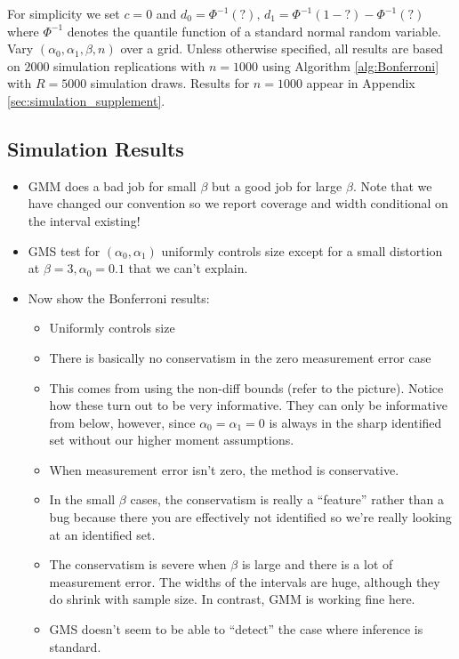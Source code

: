 For simplicity we set $c = 0$ and $d_0 = \Phi^{-1}(?), \, d_1= \Phi^{-1}(1 - ?) - \Phi^{-1}(?)$ where $\Phi^{-1}$ denotes the quantile function of a standard normal random variable.
Vary $(\alpha_0, \alpha_1, \beta, n)$ over a grid.
Unless otherwise specified, all results are based on $2000$ simulation replications with $n = 1000$ using Algorithm \ref{alg:Bonferroni} with $R = 5000$ simulation draws.
Results for $n = 1000$ appear in Appendix \ref{sec:simulation_supplement}.

\subsection{Simulation Results}

\begin{itemize}
  \item GMM does a bad job for small $\beta$ but a good job for large $\beta$.
    Note that we have changed our convention so we report coverage and width conditional on the interval existing!
  \item GMS test for $(\alpha_0, \alpha_1)$ uniformly controls size except for a small distortion at $\beta=3,\alpha_0=0.1$ that we can't explain.
  \item Now show the Bonferroni results:
    \begin{itemize}
      \item Uniformly controls size
      \item There is basically no conservatism in the zero measurement error case
      \item This comes from using the non-diff bounds (refer to the picture). Notice how these turn out to be very informative. They can only be informative from below, however, since $\alpha_0 = \alpha_1 = 0$ is always in the sharp identified set without our higher moment assumptions.
      \item When measurement error isn't zero, the method is conservative. 
      \item In the small $\beta$ cases, the conservatism is really a ``feature'' rather than a bug because there you are effectively not identified so we're really looking at an identified set.
      \item The conservatism is severe when $\beta$ is large and there is a lot of measurement error.
        The widths of the intervals are huge, although they do shrink with sample size.
        In contrast, GMM is working fine here.
      \item GMS doesn't seem to be able to ``detect'' the case where inference is standard. 

\end{itemize}
\end{itemize}
